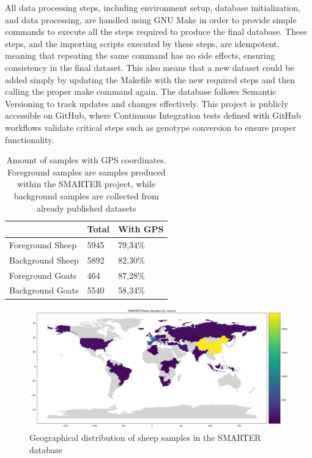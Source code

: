 \documentclass[a4paper,num-refs,gigabyte]{oup-contemporary}
\begin{document}
All data processing steps, including environment setup, database initialization, and data processing, are handled using GNU Make\citep{Stallman2004} in order to provide simple commands to execute all the steps required to produce the final database. These steps, and the importing scripts executed by these steps, are idempotent, meaning that repeating the same command has no side effects, ensuring consistency in the final dataset. This also means that a new dataset could be added simply by updating the Makefile with the new required steps and then calling the proper make command again. The database follows Semantic Versioning\citep{prestonwerner2013semantic} to track updates and changes effectively. This project is publicly accessible on GitHub\citep{SMARTERDB-GH}, where Continuous Integration tests defined with GitHub workflows validate critical steps such as genotype conversion to ensure proper functionality.

\begin{table}
\caption{Amount of samples with GPS coordinates. Foreground samples are samples produced within the SMARTER project, while background samples are collected from already published datasets}
\label{tab:samples}
\begin{center}
\begin{tabular}{l l l}
\toprule
& Total & With GPS \\
\midrule
Foreground Sheep & 5945 & 79,34\% \\
Background Sheep & 5892 & 82,30\% \\
Foreground Goats & 464 & 87,28\% \\
Background Goats & 5540 & 58,34\% \\
\bottomrule
\end{tabular}
\end{center}
\end{table}

\begin{figure}
\centering
\includegraphics[width=.95\textwidth]{sheep-by-country.png}
\caption{Geographical distribution of sheep samples in the SMARTER database}
\label{fig:sheep_samples}
\end{figure}
\end{document}
